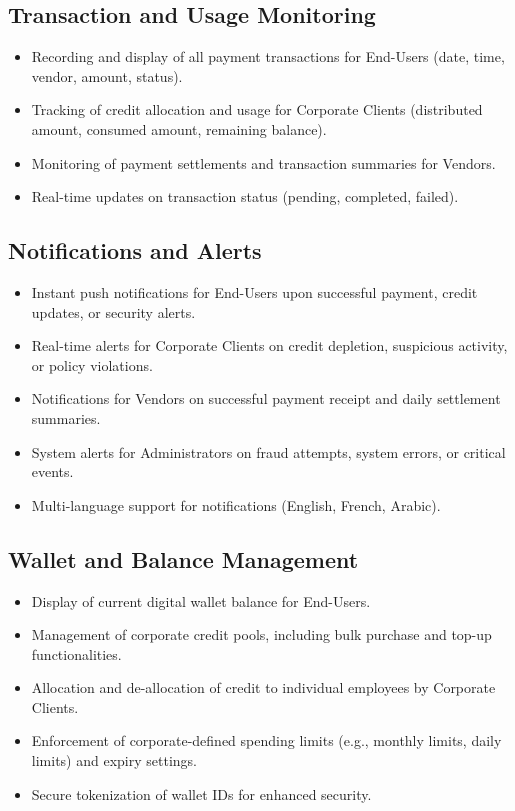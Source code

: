 \subsection{Transaction and Usage Monitoring}
\begin{itemize}
    \item Recording and display of all payment transactions for End-Users (date, time, vendor, amount, status).
    \item Tracking of credit allocation and usage for Corporate Clients (distributed amount, consumed amount, remaining balance).
    \item Monitoring of payment settlements and transaction summaries for Vendors.
    \item Real-time updates on transaction status (pending, completed, failed).
\end{itemize}

\subsection{Notifications and Alerts}
\begin{itemize}
    \item Instant push notifications for End-Users upon successful payment, credit updates, or security alerts.
    \item Real-time alerts for Corporate Clients on credit depletion, suspicious activity, or policy violations.
    \item Notifications for Vendors on successful payment receipt and daily settlement summaries.
    \item System alerts for Administrators on fraud attempts, system errors, or critical events.
\item Multi-language support for notifications (English, French, Arabic).
\end{itemize}

\subsection{Wallet and Balance Management}
\begin{itemize}
    \item Display of current digital wallet balance for End-Users.
    \item Management of corporate credit pools, including bulk purchase and top-up functionalities.
    \item Allocation and de-allocation of credit to individual employees by Corporate Clients.
    \item Enforcement of corporate-defined spending limits (e.g., monthly limits, daily limits) and expiry settings.
    \item Secure tokenization of wallet IDs for enhanced security.
\end{itemize}

